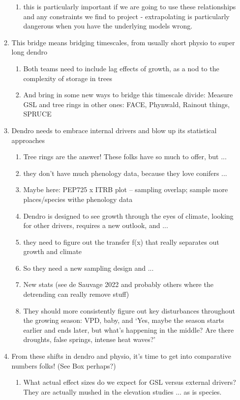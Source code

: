 \documentclass[11pt,letter]{article}
\begin{document}
\begin{enumerate}
\begin{enumerate}
\begin{enumerate}
\item this is particularly important if we are going to use these relationships and any constraints we find to project - extrapolating is particularly dangerous when you have the underlying models wrong.
\end{enumerate}
\item This bridge means bridging timescales, from usually short physio to super long dendro
\begin{enumerate}
\item Both teams need to include lag effects of growth, as a nod to the complexity of storage in trees
\item And bring in some new ways to bridge this timescale divide: Measure GSL and tree rings in other ones: FACE, Phynwald, Rainout things, SPRUCE 
\end{enumerate}
\item Dendro needs to embrace internal drivers and blow up its statistical approaches
\begin{enumerate}
\item Tree rings are the answer! These folks have so much to offer, but ...
\item they don't have much phenology data, because they love conifers ...
\item Maybe here: PEP725 x ITRB plot -- sampling overlap; sample more places/species withe phenology data
\item Dendro is designed to see growth through the eyes of climate, looking for other drivers, requires a new outlook, and ...
\item they need to figure out the transfer f(x) that really separates out growth and climate
\item So they need a new sampling design and ... 
\item New stats (see de Sauvage 2022 and probably others where the detrending can really remove stuff)
\item They should more consistently figure out key disturbances throughout the growing season: VPD, baby, and `Yes, maybe the season starts earlier and ends later, but what's happening in the middle? Are there droughts, false springs, intense heat waves?'
\end{enumerate}
\item From these shifts in dendro and physio, it's time to get into comparative numbers folks! (See Box perhaps?)
\begin{enumerate}
\item What actual effect sizes do we expect for GSL versus external drivers? They are actually mushed in the elevation studies ... as is species. 

\end{enumerate}
\end{enumerate}
\end{enumerate}
\end{document}

